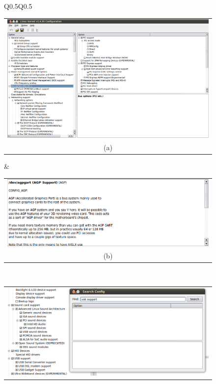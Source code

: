 \documentclass{chi2009}
\begin{document}
\begin{figure}[!t]
 \centering
 \begin{tabular}[textwidth]{Q{0.5\textwidth}Q{0.5\textwidth}}
 \begin{tabular}{c}
  \includegraphics[scale=0.25,keepaspectratio=true]{figs/xconfigmenu} \\
  (a) \\
 \end{tabular}
  & 
\begin{tabular}{c}
  \includegraphics[scale=0.25,keepaspectratio=true]{figs/xconfigoption} \\
  (b) \\
 \end{tabular} \\
 \begin{tabular}{c}
  \includegraphics[scale=0.25,keepaspectratio=true]{figs/xconfigsearch} \\

\end{tabular}
\end{tabular}
\end{figure}
\end{document}
